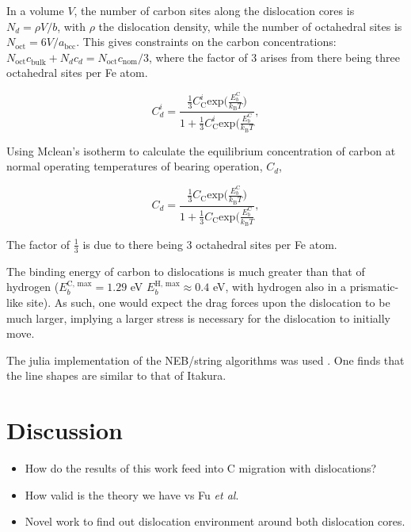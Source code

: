 \documentclass[a4paper,11pt]{article}
\begin{document}
In a volume \(V\), the number of carbon sites along the dislocation cores is \(N_d = \rho V/b\), with
\(\rho\) the dislocation density, while the number of octahedral sites is \(N_{\text{oct}} = 6V/a_{\text{bcc}}\). This
gives constraints on the carbon concentrations: \(N_{\text{oct}} c_{\text{bulk}}^{} + N_d c_d = N_{\text{oct}} c_{\text{nom}}/3\),
where the factor of 3 arises from there being three octahedral sites per Fe atom. 



\[ C_d^{i} = \frac{ 
                  \frac{1}{3} C_{\text{C}}^{i} \text{exp}\big( \frac{E_b^{\text{C}}}{k_{\text{B}}T }  \big)  }{
              1 + \frac{1}{3} C_{\text{C}}^{i} \text{exp}\big( \frac{E_b^{\text{C}}}{k_{\text{B}}T } }, \]




Using Mclean's isotherm to calculate the equilibrium concentration of carbon at normal operating
temperatures of bearing operation, \(C_d\), 

\[ C_d = \frac{ 
                  \frac{1}{3} C_{\text{C}} \text{exp}\big( \frac{E_b^{\text{C}}}{k_{\text{B}}T }  \big)  }{
              1 + \frac{1}{3} C_{\text{C}} \text{exp}\big( \frac{E_b^{\text{C}}}{k_{\text{B}}T } }, \]

The factor of \(\frac{1}{3}\) is due to there being 3 octahedral sites per Fe atom.

The binding energy of carbon to dislocations is much greater than that of hydrogen (\(E_b^{\text{C,
   max}} = 1.29\) eV \(E_b^{\text{H, max}} \approx 0.4\) eV, with hydrogen also in a prismatic-like
site). As such, one would expect the drag forces upon the dislocation to be much larger, implying
a larger stress is necessary for the dislocation to initially move. 


The julia implementation of the NEB/string algorithms was used \cite{Makri2019}. One
finds that the line shapes are similar to that of Itakura. 



\section{Discussion}
\label{sec:orgb75af9b}


\begin{itemize}
\item How do the results of this work feed into C migration with
dislocations?
\item How valid is the theory we have vs Fu \emph{et al}.
\item Novel work to find out dislocation environment around both dislocation cores.
\end{itemize}
\end{document}
